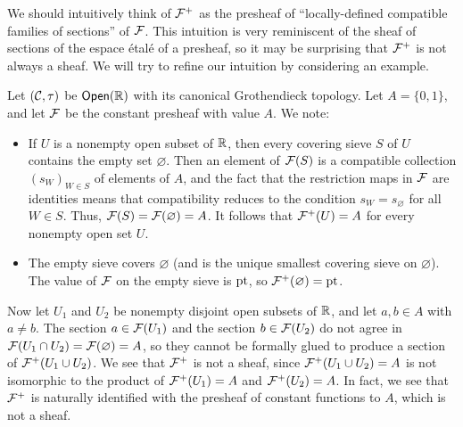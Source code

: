 We should intuitively think of $\cal{F}^+$ as the presheaf of ``locally-defined compatible families of sections'' of $\cal{F}$. This intuition is very reminiscent of the sheaf of sections of the espace étalé of a presheaf, so it may be surprising that $\cal{F}^+$ is not always a sheaf. We will try to refine our intuition by considering an example.

\begin{example}\label{example:chap:sheaves:sec:sites:plus construction of constant presheaf}
    Let $(\catC, \tau)$ be $\Open(\RR)$ with its canonical Grothendieck topology. Let $A = \{0,1\}$, and let $\cal{F}$ be the constant presheaf with value $A$. We note:
    \begin{itemize}
        \item If $U$ is a nonempty open subset of $\RR$, then every covering sieve $S$ of $U$ contains the empty set $\varnothing$. Then an element of $\cal{F}(S)$ is a compatible collection $(s_W)_{W \in S}$ of elements of $A$, and the fact that the restriction maps in $\cal{F}$ are identities means that compatibility reduces to the condition $s_W = s_\varnothing$ for all $W \in S$. Thus, $\cal{F}(S) = \cal{F}(\varnothing) = A$. It follows that $\cal{F}^+(U) = A$ for every nonempty open set $U$.
        \item The empty sieve covers $\varnothing$ (and is the unique smallest covering sieve on $\varnothing$). The value of $\cal{F}$ on the empty sieve is $\pt$, so $\cal{F}^+(\varnothing) = \pt$.
    \end{itemize}
    Now let $U_1$ and $U_2$ be nonempty disjoint open subsets of $\RR$, and let $a, b \in A$ with $a \neq b$. The section $a \in \cal{F}(U_1)$ and the section $b \in \cal{F}(U_2)$ do not agree in $\cal{F}(U_1 \cap U_2) = \cal{F}(\varnothing) = A$, so they cannot be formally glued to produce a section of $\cal{F}^+(U_1 \cup U_2)$. We see that $\cal{F}^+$ is not a sheaf, since $\cal{F}^+(U_1 \cup U_2) = A$ is not isomorphic to the product of $\cal{F}^+(U_1) = A$ and $\cal{F}^+(U_2) = A$. In fact, we see that $\cal{F}^+$ is naturally identified with the presheaf of constant functions to $A$, which is not a sheaf.


\end{example}
